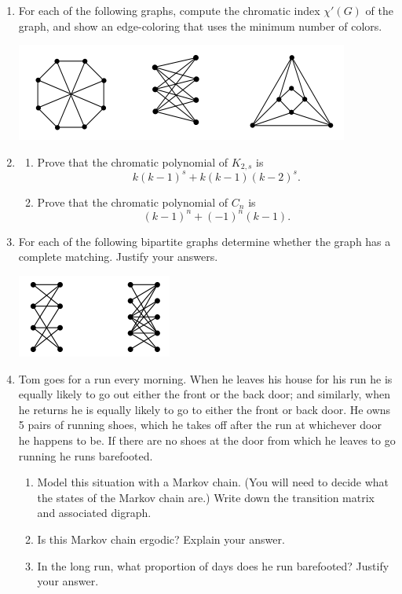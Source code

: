 \documentclass{article}
\begin{document}
\begin{enumerate}

\item For each of the following graphs, compute the chromatic index $\chi'(G)$ of the graph, and show an edge-coloring that uses the minimum number of colors.
\begin{center}
	\includegraphics[width=.7\textwidth]{pic1.png}
\end{center}

\item \begin{enumerate}
	\item Prove that the chromatic polynomial of $K_{2,s}$ is 
		\[
			k(k-1)^s + k(k-1)(k-2)^s.
		\]

	\item Prove that the chromatic polynomial of $C_n$ is 
		\[
			(k-1)^n + (-1)^n(k-1).
		\]	
\end{enumerate}

\item  For each of the following bipartite graphs determine whether the graph has a complete matching. Justify your answers.
\begin{center}
	\includegraphics[width=.3\textwidth]{pic2.png}
\end{center}


\item Tom goes for a run every morning. When he leaves his house for his run he is equally likely to go out either the front or the back door; and similarly, when he returns he is equally likely to go to either the front or back door. He owns 5 pairs of running shoes, which he takes off after the run at whichever door he happens to be. If there are no shoes at the door from which he leaves to go running he runs barefooted.

\begin{enumerate}
	\item Model this situation with a Markov chain. (You will need to decide what the states of the Markov chain are.) Write down the transition matrix and associated digraph.

	\item Is this Markov chain ergodic? Explain your answer.

	\item In the long run, what proportion of days does he run barefooted? Justify your answer.
\end{enumerate}






\end{enumerate}
\end{document}
